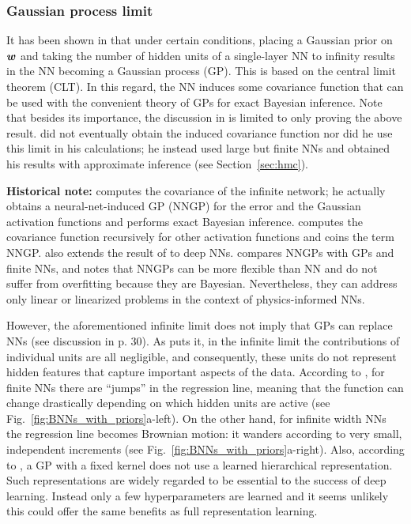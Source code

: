 \subsubsection{Gaussian process limit}\label{sec:GP_limit}

It has been shown in \textcite{neal1995bayesian} that under certain conditions, placing a Gaussian prior on $\boldsymbol{w}$ and taking the number of hidden units of a single-layer NN to infinity results in the NN becoming a Gaussian process (GP). 
This is based on the central limit theorem (CLT).
In this regard, the NN induces some covariance function that can be used with the convenient theory of GPs for exact Bayesian inference.  
Note that besides its importance, the discussion in \textcite{neal1995bayesian} is limited to only proving the above result. 
\textcite{neal1995bayesian} did not eventually obtain the induced covariance function nor did he use this limit in his calculations; he instead used large but finite NNs and obtained his results with approximate inference (see Section~\ref{sec:hmc}). 

\textbf{Historical note:} \textcite{williams1997computing} computes the covariance of the infinite network; he actually obtains a neural-net-induced GP (NNGP) for the error and the Gaussian activation functions and performs exact Bayesian inference.
\textcite{lee2017deep} computes the covariance function recursively for other activation functions and coins the term NNGP.
\textcite{lee2017deep} also extends the result of \textcite{neal1995bayesian} to deep NNs.
\textcite{pang2019neuralnetinduced} compares NNGPs with GPs and finite NNs, and notes that NNGPs can be more flexible than NN and do not suffer from overfitting because they are Bayesian.
Nevertheless, they can address only linear or linearized problems in the context of physics-informed NNs.

However, the aforementioned infinite limit does not imply that GPs can replace NNs (see discussion in \cite{mackay1998introduction} p. 30).
As \textcite{neal1995bayesian} puts it, in the infinite limit the contributions of individual units are all negligible, and consequently, these units do not represent hidden features that capture important aspects of the data.
According to \textcite{nalisnick2018priors}, for finite NNs there are ``jumps'' in the regression line, meaning that the function can change drastically depending on which hidden units are active (see Fig.~\ref{fig:BNNs_with_priors}a-left).
On the other hand, for infinite width NNs the regression line becomes Brownian motion: it wanders according to very small, independent increments (see Fig.~\ref{fig:BNNs_with_priors}a-right).
Also, according to \textcite{matthews2018gaussian}, a GP with a fixed kernel does not use a learned hierarchical representation. 
Such representations are widely regarded to be essential to the success of deep learning. 
Instead only a few hyperparameters are learned and it seems unlikely this could offer the same benefits as full representation learning. 


